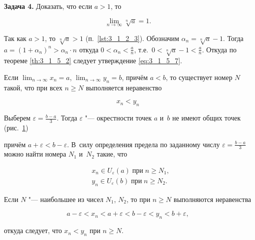 \textbf{Задача 4.}\label{ex:3_1_5_4} Доказать, что если $a > 1$, то

\begin{equation}\label{eq:3_1_5_7}
\displaystyle \lim_{n \to \infty} \sqrt[n]{a} = 1.
\end{equation}

Так как $a > 1$, то $\sqrt[n]{a} > 1$ (п.\ \ref{lst:3_1_2_3}).
Обозначим $\alpha_{n} = \sqrt[n]{a} - 1$.
Тогда $a = (1 + \alpha_{n})^{n} > \alpha_{n} \cdot n$ откуда
$\displaystyle 0 < \alpha_{n} < \frac{a}{n}$, т.е.\
$\displaystyle 0 < \sqrt[n]{a} - 1 < \frac{a}{n}$.
Откуда по теореме \ref{th:3_1_5_2} следует утверждение \eqref{eq:3_1_5_7}.

\begin{Th}\label{th:3_1_5_3}
Если
$\displaystyle \lim_{n \to \infty} x_{n} = a$,
$\displaystyle \lim_{n \to \infty} y_{n} = b$,
причём $a < b$, то существует номер $N$ такой, что при всех $n \geqslant N$
выполняется неравенство

\begin{equation}\label{eq:3_1_5_8}
x_{n} < y_{n}
\end{equation}
\end{Th}

Выберем $\displaystyle \varepsilon = \frac{b - a}{3}$.
Тогда $\varepsilon$ "--- окрестности точек $a$ и~$b$ не имеют общих точек
(рис.\ \ref{fig:3_1_5_5})

\begin{figure}\label{fig:3_1_5_5}
\end{figure}

\noindent
причём $a + \varepsilon < b - \varepsilon$.
В~силу определения предела по заданному числу $\displaystyle \varepsilon = \frac{b - a}{3}$
можно найти номера $N_{1}$ и~$N_{2}$ такие, что

\begin{align*}
& x_{n} \in U_{\varepsilon}(a) \; \text{при} \; n \geqslant N_{1}, \\
& y_{n} \in U_{\varepsilon}(b) \; \text{при} \; n \geqslant N_{2}.
\end{align*}

\noindent
Если $N$ "--- наибольшее из чисел $N_{1}$, $N_{2}$, то при $n \geqslant N$ выполняются
неравенства

\begin{equation*}
a - \varepsilon <
x_{n} < 
a + \varepsilon <
b - \varepsilon <
y_{n} < 
b + \varepsilon,
\end{equation*}

\noindent
откуда следует, что $x_{n} < y_{n}$ при $n \geqslant N$.

